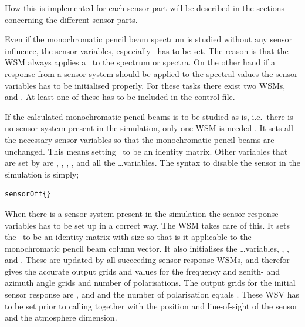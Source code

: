 How this is implemented for each sensor part will be described in the 
sections concerning the different sensor parts.

Even if the monochromatic pencil beam spectrum is studied without any sensor influence, the sensor variables, especially \SnsMtr\ has to be set. The reason is that the WSM  always applies a \SnsMtr\ to the spectrum or spectra. On the other hand if a response from a sensor system should be applied to the spectral values the sensor variables has to be initialised properly. For these tasks there exist two WSMs,  and . At least one of these has to be included in the control file.

If the calculated monochromatic pencil beams is to be studied as is, i.e.~there is no sensor system present in the simulation, only one WSM is needed . It sets all the necessary sensor variables so that the monochromatic pencil beams are unchanged. This means setting \SnsMtr\ to be an identity matrix. Other variables that are set by  are , , , ,  and all the \ldots variables.
The syntax to disable the sensor in the simulation is simply;
\begin{verbatim}
sensorOff{}
\end{verbatim}

When there is a sensor system present in the simulation the sensor response variables has to be set up in a correct way. The WSM  takes care of this. It sets the \SnsMtr\ to be an identity matrix with size so that is it applicable to the monochromatic pencil beam column vector. It also initialises
the \ldots variables, , ,  and . These are updated by all succeeding sensor response WSMs, and therefor gives the accurate output grids and values for the frequency and zenith- and azimuth angle grids and number of polarisations. The output grids for the initial sensor response are ,  and
 and the number of polarisation equals . These WSV has to be set prior to calling  together with the position and line-of-sight of the sensor and the atmosphere dimension.

